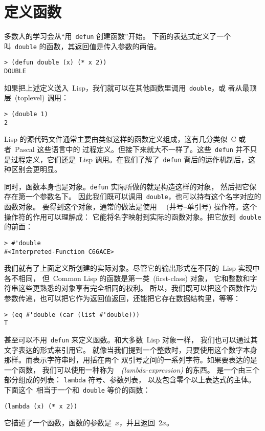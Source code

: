\section{定义函数}
\label{sec:defining_functions}

多数人的学习会从``用~\texttt{defun} 创建函数''开始。
下面的表达式定义了一个叫~\verb|double| 的函数，其返回值是传入参数的两倍。
\begin{lstlisting}
> (defun double (x) (* x 2))
DOUBLE
\end{lstlisting}
如果把上述定义送入~Lisp，我们就可以在其他函数里调用~\verb|double|，或
者从最顶层~(toplevel) 调用：
\begin{lstlisting}
> (double 1)
2
\end{lstlisting}
Lisp 的源代码文件通常主要由类似这样的函数定义组成，这有几分类似~C 或者~Pascal 这些语言中的
过程定义。但接下来就大不一样了。这些~\verb|defun| 并不只是过程定义，它们还是~Lisp
调用。在我们了解了~\verb|defun| 背后的运作机制后，这种区别会更明显。

同时，函数本身也是对象。\verb|defun| 实际所做的就是构造这样的对象，
然后把它保存在第一个参数名下。
因此我们既可以调用~\verb|double|，也可以持有这个名字对应的函数对象。
要得到这个对象，通常的做法是使用
~\sq{}~(井号--单引号) 操作符。这个操作符的作用可以理解成：
它能将名字映射到实际的函数对象。把它放到~\verb|double| 的前面：
\begin{lstlisting}
> #'double
#<Interpreted-Function C66ACE>
\end{lstlisting}
我们就有了上面定义所创建的实际对象。尽管它的输出形式在不同的~Lisp 实现中各不相同，
但~Common Lisp 的函数是第一类~(first-class) 对象，
它和整数和字符串这些更熟悉的对象享有完全相同的权利。
所以，我们既可以把这个函数作为参数传递，也可以把它作为返回值返回，还能把它存在数据结构里，等等：
\begin{lstlisting}
> (eq #'double (car (list #'double)))
T
\end{lstlisting}

甚至可以不用~\verb|defun| 来定义函数。和大多数~Lisp 对象一样，
我们也可以通过其文字表达的形式来引用它。
就像当我们提到一个整数时，只要使用这个数字本身那样。而表示字符串时，用括在两个
双引号之间的一系列字符。如果要表达的是一个函数，
我们可以使用一种称为~\emph{\lexpr~(lambda-expression)} 的东西。
\lexpr 是一个由三个部分组成的列表：
\verb|lambda| 符号、参数列表，
以及包含零个以上表达式的主体。下面这个~\lexpr 相当于一个和~\verb|double|
等价的函数：
\begin{lstlisting}
(lambda (x) (* x 2))
\end{lstlisting}
它描述了一个函数，函数的参数是~$x$，并且返回~$2x$。

